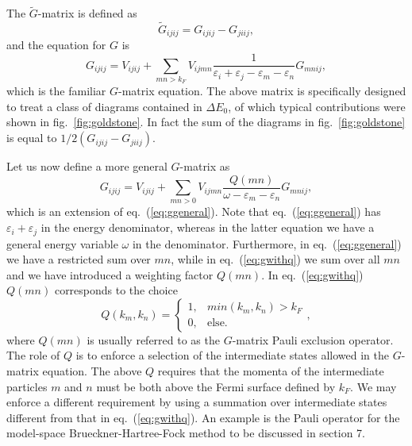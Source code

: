 The $\tilde{G}$-matrix  is defined as
\begin{equation}
    \tilde{G}_{ijij}=G_{ijij}-G_{jiij},
\end{equation}
and the equation for $G$ is
\begin{equation}
      G_{ijij}=V_{ijij}
      +\sum_{mn>k_F}V_{ijmn}\frac{1}
      {\varepsilon_i+\varepsilon_j-\varepsilon_m-\varepsilon_n}
      G_{mnij},
      \label{eq:ggeneral}
\end{equation}
which is the familiar $G$-matrix equation. The above
matrix is specifically designed to treat a class of diagrams
contained in $\Delta E_0$, of which typical contributions
were shown in fig.\ \ref{fig:goldstone}. In fact the sum of the diagrams
in fig.\ \ref{fig:goldstone} is equal to $1/2(G_{ijij}-G_{jiij})$.

Let us now define a more general $G$-matrix as
\begin{equation}
      G_{ijij}=V_{ijij}
      +\sum_{mn>0}V_{ijmn}\frac{Q(mn)}
      {\omega -\varepsilon_m-\varepsilon_n}
      G_{mnij},
      \label{eq:gwithq}
\end{equation}
which is an extension of eq.\ (\ref{eq:ggeneral}). Note that 
eq.\ (\ref{eq:ggeneral}) has
$\varepsilon_i+\varepsilon_j$ in the energy denominator, whereas
in the latter equation we have a general energy variable $\omega$
in the denominator. Furthermore, in eq.\ (\ref{eq:ggeneral})
we have a restricted
sum over $mn$, while in eq.\ (\ref{eq:gwithq})
we sum over all $mn$ and we have
introduced a weighting factor $Q(mn)$. In eq.\ (\ref{eq:gwithq}) $Q(mn)$
corresponds to the choice
\begin{equation}
   Q(k_m , k_n ) =
    \left\{\begin{array}{cc}1,&min(k_m ,k_n ) > k_F\\
    0,&\mathrm{else}.\end{array}\right. ,
\end{equation}
where $Q(mn)$ is usually referred to as the $G$-matrix Pauli
exclusion operator. The role of $Q$ is to enforce a selection
of the intermediate states allowed in the $G$-matrix equation. The above
$Q$ requires that the momenta of the intermediate particles $m$ and $n$
must be both above the Fermi surface defined by $k_F$. We may enforce
a different requirement by using a summation over intermediate states
different from that in eq.\ (\ref{eq:gwithq}).
An example is the Pauli operator
for the model-space Brueckner-Hartree-Fock method to be discussed
in section 7.


